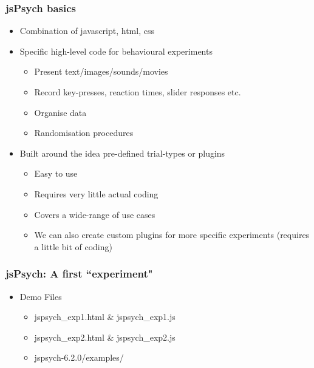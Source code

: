 \documentclass[t]{beamer}
\begin{document}
\begin{frame}[fragile]
    \frametitle{jsPsych basics}
    \begin{itemize}
        \item Combination of javascript, html, css
        \item Specific high-level code for behavioural experiments 
            \begin{itemize}
                \item Present text/images/sounds/movies
                \item Record key-presses, reaction times, slider responses etc.
                \item Organise data 
                \item Randomisation procedures
            \end{itemize}
        \item Built around the idea pre-defined trial-types or plugins
            \begin{itemize}
                \item Easy to use 
                \item Requires very little actual coding
                \item Covers a wide-range of use cases 
                \item We can also create custom plugins for more specific experiments (requires a little bit of coding)
            \end{itemize}
    \end{itemize}
\end{frame}


\begin{frame}[fragile]
    \frametitle{jsPsych: A first ``experiment"}
    \begin{itemize}
        \item Demo Files
            \begin{itemize}
                \item jspsych\_exp1.html \& jspsych\_exp1.js
                \item jspsych\_exp2.html \& jspsych\_exp2.js
                \item jspsych-6.2.0/examples/
            \end{itemize}
    \end{itemize}
\end{frame}
\end{document}
